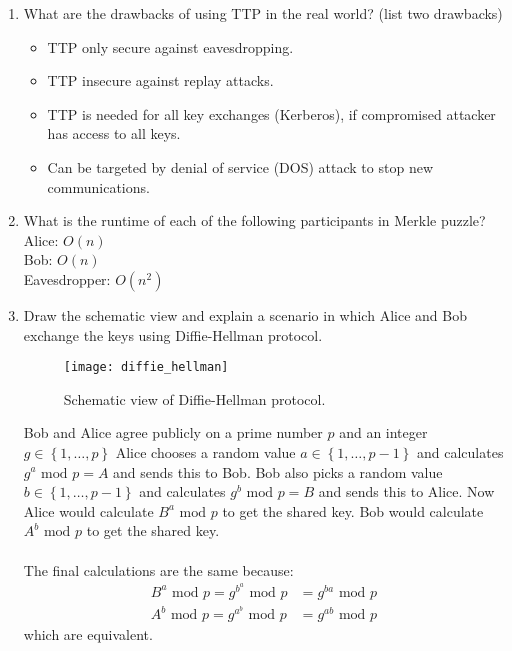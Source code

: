 \documentclass[a4paper]{article}
\begin{document}
\begin{enumerate}
		\item What are the drawbacks of using TTP in the real world? (list two drawbacks)
			\begin{itemize}
				\item TTP only secure against eavesdropping.
				\item TTP insecure against replay attacks.
				\item TTP is needed for all key exchanges (Kerberos), if compromised
					attacker has access to all keys.
				\item Can be targeted by denial of service (DOS) attack to stop new
					communications.
			\end{itemize}
		\clearpage
		\item What is the runtime of each of the following participants in Merkle puzzle?\\
			Alice: $O\left( n \right) $\\
			Bob: $O\left( n \right) $\\
			Eavesdropper: $O\left( n^{2} \right) $\\

		\item Draw the schematic view and explain a scenario in which Alice and Bob exchange
			the keys using Diffie-Hellman protocol.
			\begin{figure}[ht!]
				\centering
				\texttt{[image: diffie\_hellman]}
				\caption{Schematic view of Diffie-Hellman protocol.}
				\label{fig:diffie_helman}
			\end{figure}

			Bob and Alice agree publicly on a prime number $p$ and an integer
			$g \in \left\{ 1,\ldots,p \right\}$ Alice chooses a random value
			$a \in \left\{ 1,\ldots,p-1 \right\}$ and calculates $g^{a} \text{ mod } p = A$ and sends
			this to Bob. Bob also picks a random value $b \in \left\{ 1,\ldots,p-1 \right\}$
			and calculates $g^{b} \text{ mod } p = B$ and sends this to Alice.
			Now Alice would calculate $B^{a} \text{ mod } p$ to get the shared key.
			Bob would calculate $A^{b} \text{ mod } p$ to get the shared key.\\
			\\
			The final calculations are the same because:
			\begin{align*}
				B^a \text{ mod }p = g^{b^a} \text{ mod } p &= g^{ba} \text{ mod } p\\
				A^b \text{ mod }p = g^{a^b} \text{ mod } p &= g^{ab} \text{ mod } p
			\end{align*}
			which are equivalent.
	\end{enumerate}
\end{document}
